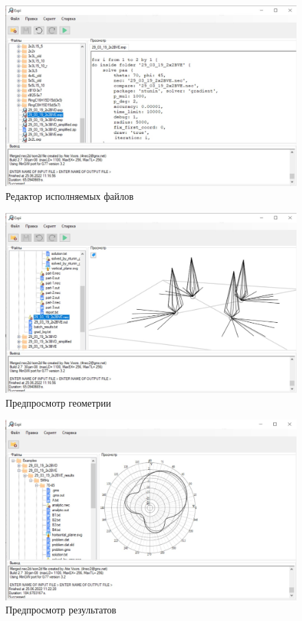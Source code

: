 \begin{figure}[h!]
  \centering
  \includegraphics[width=\linewidth]{expi_script.jpeg}
  \caption{Редактор исполняемых файлов}
  \label{ic:applic_b_edit}
\end{figure}

\begin{figure}[h!]
  \centering
  \includegraphics[width=\linewidth]{expi_paa.jpeg}
  \caption{Предпросмотр геометрии}
  \label{ic:applic_b_preview}
\end{figure}

\begin{figure}[h!]
  \centering
  \includegraphics[width=\linewidth]{expi_results.jpeg}
  \caption{Предпросмотр результатов}
  \label{ic:applic_b_results}
\end{figure}

